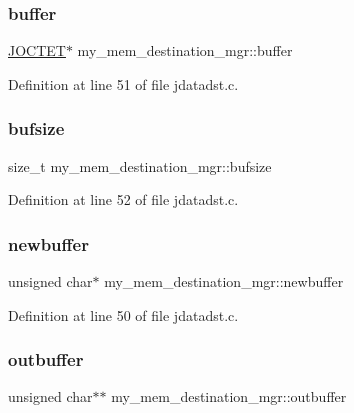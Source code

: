 \subsubsection{\texorpdfstring{buffer}{buffer}}
{\footnotesize\ttfamily \mbox{\hyperlink{jmorecfg_8h_a356ad249f20e691b520da439f92cccbc}{J\+O\+C\+T\+ET}}$\ast$ my\+\_\+mem\+\_\+destination\+\_\+mgr\+::buffer}



Definition at line 51 of file jdatadst.\+c.

\mbox{\label{structmy__mem__destination__mgr_a216685d583a991f4757f4e3f6a5de675}} 
\subsubsection{\texorpdfstring{bufsize}{bufsize}}
{\footnotesize\ttfamily size\+\_\+t my\+\_\+mem\+\_\+destination\+\_\+mgr\+::bufsize}



Definition at line 52 of file jdatadst.\+c.

\mbox{\label{structmy__mem__destination__mgr_ac0b918872c851937dd8751d1a8105220}} 
\subsubsection{\texorpdfstring{newbuffer}{newbuffer}}
{\footnotesize\ttfamily unsigned char$\ast$ my\+\_\+mem\+\_\+destination\+\_\+mgr\+::newbuffer}



Definition at line 50 of file jdatadst.\+c.

\mbox{\label{structmy__mem__destination__mgr_a61dceebdaf153d422514527aa0e1bf6e}} 
\subsubsection{\texorpdfstring{outbuffer}{outbuffer}}
{\footnotesize\ttfamily unsigned char$\ast$$\ast$ my\+\_\+mem\+\_\+destination\+\_\+mgr\+::outbuffer}



